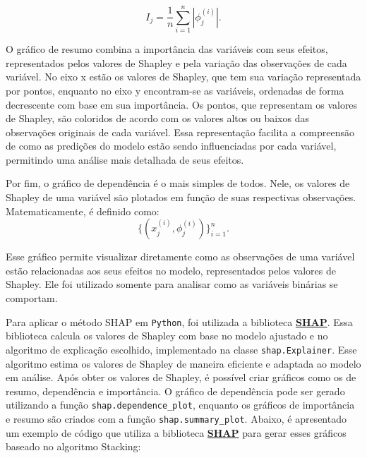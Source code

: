 \documentclass[
  12pt,
  a4paper,
]{scrreprt}
\begin{document}
\[
I_j = \frac{1}{n}\sum^{n}_{i = 1} |\phi_j^{\left(i\right)}|\text{.}
\]

O gráfico de resumo combina a importância das variáveis com seus
efeitos, representados pelos valores de Shapley e pela variação das
observações de cada variável. No eixo x estão os valores de Shapley, que
tem sua variação representada por pontos, enquanto no eixo y
encontram-se as variáveis, ordenadas de forma decrescente com base em
sua importância. Os pontos, que representam os valores de Shapley, são
coloridos de acordo com os valores altos ou baixos das observações
originais de cada variável. Essa representação facilita a compreensão de
como as predições do modelo estão sendo influenciadas por cada variável,
permitindo uma análise mais detalhada de seus efeitos.

\vspace{12pt}

Por fim, o gráfico de dependência é o mais simples de todos. Nele, os
valores de Shapley de uma variável são plotados em função de suas
respectivas observações. Matematicamente, é definido como: \[
\{\left(x_j^{\left(i\right)}, \phi_j^{\left(i\right)} \right)\}^{n}_{i=1}\text{.}
\]

Esse gráfico permite visualizar diretamente como as observações de uma
variável estão relacionadas aos seus efeitos no modelo, representados
pelos valores de Shapley. Ele foi utilizado somente para analisar como
as variáveis binárias se comportam.

\vspace{12pt}

Para aplicar o método SHAP em \texttt{Python}, foi utilizada a
biblioteca \href{https://shap.readthedocs.io/en/latest/}{\textbf{SHAP}}.
Essa biblioteca calcula os valores de Shapley com base no modelo
ajustado e no algoritmo de explicação escolhido, implementado na classe
\texttt{shap.Explainer}. Esse algoritmo estima os valores de Shapley de
maneira eficiente e adaptada ao modelo em análise. Após obter os valores
de Shapley, é possível criar gráficos como os de resumo, dependência e
importância. O gráfico de dependência pode ser gerado utilizando a
função \texttt{shap.dependence\_plot}, enquanto os gráficos de
importância e resumo são criados com a função
\texttt{shap.summary\_plot}. Abaixo, é apresentado um exemplo de código
que utiliza a biblioteca
\href{https://shap.readthedocs.io/en/latest/}{\textbf{SHAP}} para gerar
esses gráficos baseado no algoritmo Stacking:
\end{document}
